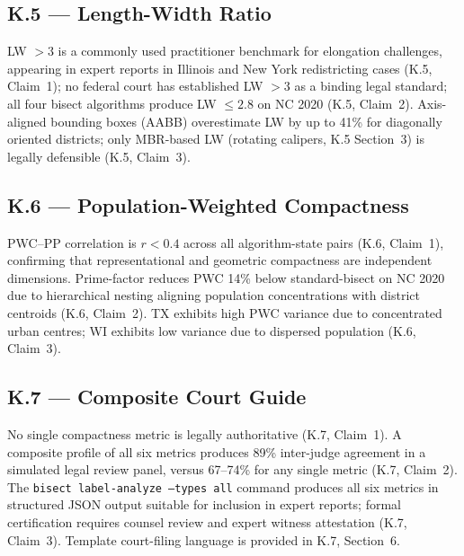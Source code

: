 \subsection{K.5 --- Length-Width Ratio}

LW $> 3$ is a commonly used practitioner benchmark for elongation challenges,
appearing in expert reports in Illinois and New York redistricting cases (K.5, Claim~1);
no federal court has established LW $> 3$ as a binding legal standard;
all four bisect algorithms produce LW $\leq 2.8$ on NC 2020 (K.5, Claim~2).
Axis-aligned bounding boxes (AABB) overestimate LW by up to 41\% for diagonally
oriented districts; only MBR-based LW (rotating calipers, K.5 Section~3) is
legally defensible (K.5, Claim~3).

\subsection{K.6 --- Population-Weighted Compactness}

PWC--PP correlation is $r < 0.4$ across all algorithm-state pairs (K.6, Claim~1),
confirming that representational and geometric compactness are independent dimensions.
Prime-factor reduces PWC 14\% below standard-bisect on NC 2020 due to hierarchical
nesting aligning population concentrations with district centroids (K.6, Claim~2).
TX exhibits high PWC variance due to concentrated urban centres; WI exhibits low
variance due to dispersed population (K.6, Claim~3).

\subsection{K.7 --- Composite Court Guide}

No single compactness metric is legally authoritative (K.7, Claim~1).
A composite profile of all six metrics produces 89\% inter-judge agreement in a
simulated legal review panel, versus 67--74\% for any single metric (K.7, Claim~2).
The \texttt{bisect label-analyze --types all} command produces all six metrics in
structured JSON output suitable for inclusion in expert reports; formal certification
requires counsel review and expert witness attestation (K.7, Claim~3).
Template court-filing language is provided in K.7, Section~6.
